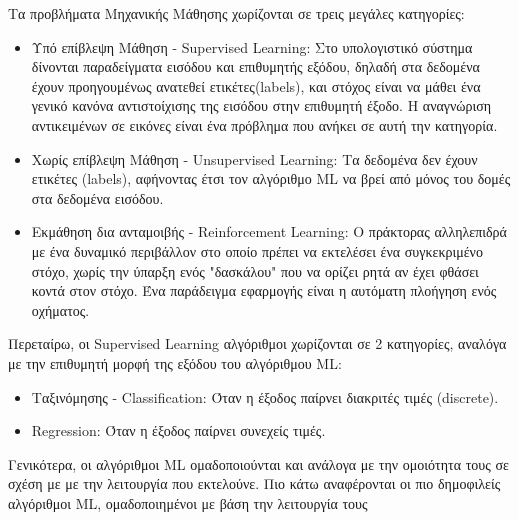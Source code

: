 Τα προβλήματα Μηχανικής Μάθησης χωρίζονται σε τρεις μεγάλες κατηγορίες:
\begin{itemize}
  \item{Υπό επίβλεψη Μάθηση - Supervised Learning:
      Στο υπολογιστικό σύστημα δίνονται παραδείγματα εισόδου και επιθυμητής εξόδου,
      δηλαδή στα δεδομένα έχουν προηγουμένως ανατεθεί ετικέτες(labels),
      και στόχος είναι να μάθει ένα γενικό κανόνα αντιστοίχισης της εισόδου στην επιθυμητή έξοδο.
      Η αναγνώριση αντικειμένων σε εικόνες είναι ένα πρόβλημα που ανήκει σε αυτή την κατηγορία.
    }
  \item{Χωρίς επίβλεψη Μάθηση - Unsupervised Learning:
      Τα δεδομένα δεν έχουν ετικέτες (labels), αφήνοντας έτσι τον αλγόριθμο ML να βρεί
      από μόνος του δομές στα δεδομένα εισόδου.
    }
  \item{Εκμάθηση δια ανταμοιβής - Reinforcement Learning:
      Ο πράκτορας αλληλεπιδρά με ένα δυναμικό περιβάλλον στο οποίο πρέπει να
      εκτελέσει ένα συγκεκριμένο στόχο, χωρίς την ύπαρξη ενός "δασκάλου" που να
      ορίζει ρητά αν έχει φθάσει κοντά στον στόχο. Ένα παράδειγμα εφαρμογής
      είναι η αυτόματη πλοήγηση ενός οχήματος.
    }
\end{itemize}
Περεταίρω, οι Supervised Learning αλγόριθμοι χωρίζονται σε 2 κατηγορίες, αναλόγα
με την επιθυμητή μορφή της εξόδου του αλγόριθμου ML:
\begin{itemize}
  \item{Ταξινόμησης - Classification: Όταν η έξοδος παίρνει διακριτές τιμές (discrete).}
  \item{Regression: Όταν η έξοδος παίρνει συνεχείς τιμές.}
\end{itemize}

Γενικότερα, οι αλγόριθμοι ML ομαδοποιούνται και ανάλογα με την ομοιότητα τους
σε σχέση με με την λειτουργία που εκτελούνε. Πιο κάτω αναφέρονται οι πιο δημοφιλείς
αλγόριθμοι ML, ομαδοποιημένοι με βάση την λειτουργία τους
\\


